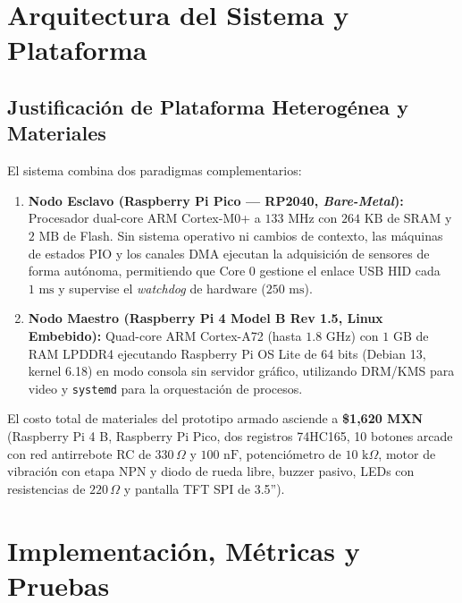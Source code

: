 \documentclass[conference]{IEEEtran}
\begin{document}
\section{Arquitectura del Sistema y Plataforma}



\subsection{Justificación de Plataforma Heterogénea y Materiales}
El sistema combina dos paradigmas complementarios:
\begin{enumerate}
	\item \textbf{Nodo Esclavo (Raspberry Pi Pico — RP2040, \textit{Bare-Metal}):} Procesador dual-core ARM Cortex-M0+ a $133\text{ MHz}$ con $264\text{ KB}$ de SRAM y $2\text{ MB}$ de Flash. Sin sistema operativo ni cambios de contexto, las máquinas de estados PIO y los canales DMA ejecutan la adquisición de sensores de forma autónoma, permitiendo que Core 0 gestione el enlace USB HID cada $1\text{ ms}$ y supervise el \textit{watchdog} de hardware ($250\text{ ms}$).
	\item \textbf{Nodo Maestro (Raspberry Pi 4 Model B Rev 1.5, Linux Embebido):} Quad-core ARM Cortex-A72 (hasta $1.8\text{ GHz}$) con $1\text{ GB}$ de RAM LPDDR4 ejecutando Raspberry Pi OS Lite de 64 bits (Debian 13, kernel 6.18) en modo consola sin servidor gráfico, utilizando DRM/KMS para video y \texttt{systemd} para la orquestación de procesos.
\end{enumerate}

El costo total de materiales del prototipo armado asciende a \textbf{\$1,620 MXN} (Raspberry Pi 4 B, Raspberry Pi Pico, dos registros 74HC165, 10 botones arcade con red antirrebote RC de $330\,\Omega$ y $100\text{ nF}$, potenciómetro de $10\text{ k}\Omega$, motor de vibración con etapa NPN y diodo de rueda libre, buzzer pasivo, LEDs con resistencias de $220\,\Omega$ y pantalla TFT SPI de 3.5'').

\section{Implementación, Métricas y Pruebas}
\end{document}
